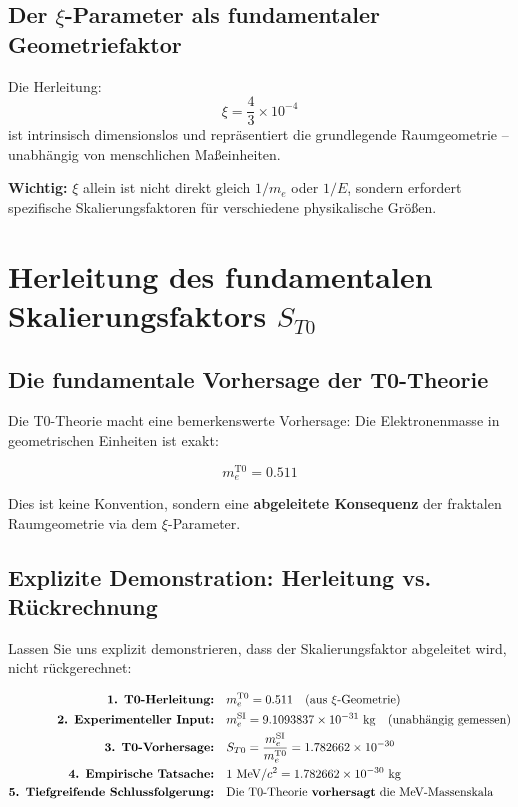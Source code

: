 \documentclass[12pt,a4paper]{article}
\begin{document}
	\subsection{Der $\xi$-Parameter als fundamentaler Geometriefaktor}
	Die Herleitung:
	\begin{equation}
		\xi = \frac{4}{3} \times 10^{-4}
	\end{equation}
	ist intrinsisch dimensionslos und repräsentiert die grundlegende Raumgeometrie -- unabhängig von menschlichen Maßeinheiten.
	
	\textbf{Wichtig:} $\xi$ allein ist nicht direkt gleich $1/m_e$ oder $1/E$, sondern erfordert spezifische Skalierungsfaktoren für verschiedene physikalische Größen.
	
	\section{Herleitung des fundamentalen Skalierungsfaktors $S_{T0}$}
	\label{sec:scaling-derivation}
	
	\subsection{Die fundamentale Vorhersage der T0-Theorie}
	
	Die T0-Theorie macht eine bemerkenswerte Vorhersage: Die Elektronenmasse in geometrischen Einheiten ist exakt:
	
	\begin{equation}
		m_e^{\mathrm{T0}} = 0.511
	\end{equation}
	
	Dies ist keine Konvention, sondern eine \textbf{abgeleitete Konsequenz} der fraktalen Raumgeometrie via dem $\xi$-Parameter.
	
	\subsection{Explizite Demonstration: Herleitung vs. Rückrechnung}
	
	Lassen Sie uns explizit demonstrieren, dass der Skalierungsfaktor abgeleitet wird, nicht rückgerechnet:
	
	\begin{align}
		\textbf{1. T0-Herleitung:} \quad & m_e^{\mathrm{T0}} = 0.511 \quad \text{(aus $\xi$-Geometrie)} \\
		\textbf{2. Experimenteller Input:} \quad & m_e^{\mathrm{SI}} = 9.1093837 \times 10^{-31}~\mathrm{kg} \quad \text{(unabhängig gemessen)} \\
		\textbf{3. T0-Vorhersage:} \quad & S_{T0} = \frac{m_e^{\mathrm{SI}}}{m_e^{\mathrm{T0}}} = 1.782662 \times 10^{-30} \\
		\textbf{4. Empirische Tatsache:} \quad & 1~\mathrm{MeV}/c^2 = 1.782662 \times 10^{-30}~\mathrm{kg} \\
		\textbf{5. Tiefgreifende Schlussfolgerung:} \quad & \text{Die T0-Theorie \textbf{vorhersagt} die MeV-Massenskala}
	\end{align}
	
\end{document}
